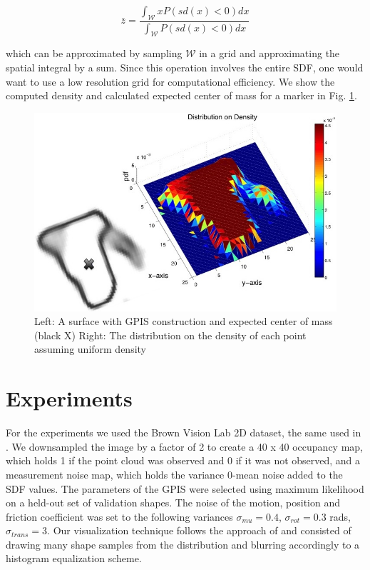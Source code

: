\documentclass[journal,transmag]{IEEEtran}%
\begin{document}
\label{eq:mass}
\begin{equation}
  \bar{z} 
  =
  \frac
    {\int_{\mathcal{W}}x P(sd(x)<0) dx}
    {\int_{\mathcal{W}}  P(sd(x)<0) dx}
\end{equation}

which can be approximated by sampling $\mathcal{W}$ in a grid and approximating the spatial integral by a sum. Since this operation involves the entire SDF, one would want to use a low resolution grid for computational efficiency. We show the computed density and calculated expected center of mass for a marker in Fig. \ref{fig:GPIS_MASS}.


\begin{figure}[ht!]
\centering
\includegraphics[scale = 0.3]{figures/Slide06.jpg}
\caption{ \footnotesize Left: A surface with GPIS construction and expected center of mass (black X)
Right: The distribution on the density of each point assuming uniform density}
\vspace*{-10pt}
\label{fig:GPIS_MASS}
\end{figure}




\section{Experiments}
For the experiments we used the Brown Vision Lab 2D dataset, the same used in \cite{christopoulos2007handling}. We downsampled the image by a factor of 2 to create a 40 x 40 occupancy map, which holds 1 if the point cloud was observed and 0 if it was not observed, and a measurement noise map, which holds the variance 0-mean noise added to the SDF values. The parameters of the GPIS were selected using maximum likelihood on a held-out set of validation shapes. The noise of the motion, position and friction coefficient was set to the following variances $\sigma_{mu} = 0.4$, $\sigma_{rot} = 0.3$ rads,$\sigma_{trans} = 3$. Our visualization technique follows the approach of \cite{mahler2015opt} and consisted of drawing many shape samples from the distribution and blurring accordingly to a histogram equalization scheme. 
\end{document}
